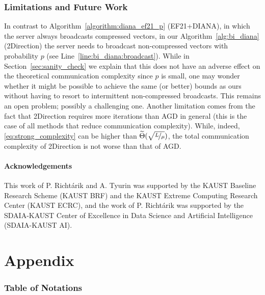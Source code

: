 \documentclass{article} %
\theoremstyle{plain}
\theoremstyle{definition}
\theoremstyle{remark}
\newcommand{\green}{\color{mydarkgreen}}
\newcommand{\algname}[1]{{\small\green\sf #1}}
\begin{document}
\section{Limitations and Future Work}
In contrast to Algorithm~\ref{algorithm:diana_ef21_p} (\algname{EF21+DIANA}), in which the server always broadcasts compressed vectors, in our Algorithm~\ref{alg:bi_diana} (\algname{2Direction})   the server needs to broadcast non-compressed vectors  with probability $p$ (see Line~\ref{line:bi_diana:broadcast}). While in Section~\ref{sec:sanity_check} we explain that this does not have an adverse effect on the theoretical communication complexity since $p$ is small, one may wonder whether it might be  possible to  achieve the same (or better) bounds as ours without having to resort to intermittent non-compressed broadcasts. This remains an open problem; possibly a challenging one. Another limitation comes from the fact that \algname{2Direction} requires more iterations than \algname{AGD} in general (this is the case of all methods that reduce communication complexity). While, indeed, \eqref{eq:strong_complexity} can be higher than $\widetilde{\Theta}(\sqrt{\nicefrac{L}{\mu}})$, the total communication complexity of \algname{2Direction} is not worse than that of \algname{AGD}.


\subsection*{Acknowledgements}
This work of P. Richt\'{a}rik and A. Tyurin was supported by the KAUST Baseline Research Scheme (KAUST BRF) and the KAUST Extreme Computing Research Center (KAUST ECRC), and the work of P. Richt\'{a}rik was supported by the SDAIA-KAUST Center of Excellence in Data Science and Artificial Intelligence (SDAIA-KAUST AI).






\clearpage
\appendix

\part*{Appendix}

\tableofcontents
\newpage

\section{Table of Notations}
\end{document}
